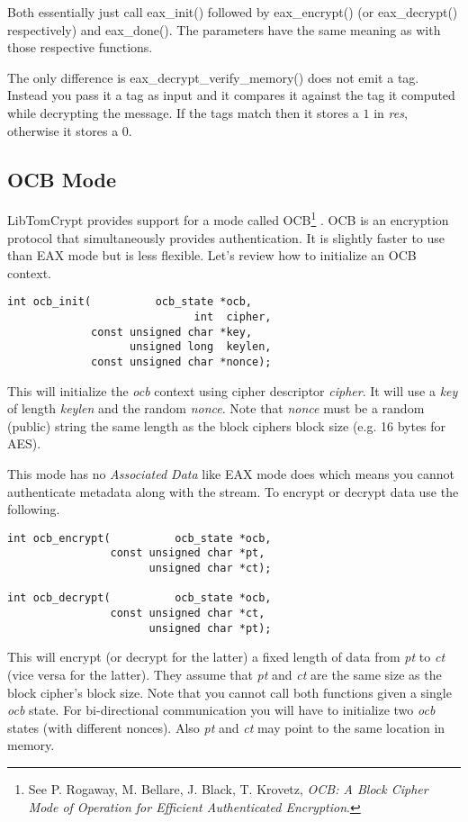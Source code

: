 \documentclass[synpaper]{book}
\begin{document}
Both essentially just call eax\_init() followed by eax\_encrypt() (or eax\_decrypt() respectively) and eax\_done().  The parameters
have the same meaning as with those respective functions.

The only difference is eax\_decrypt\_verify\_memory() does not emit a tag.  Instead you pass it a tag as input and it compares it against
the tag it computed while decrypting the message.  If the tags match then it stores a $1$ in \textit{res}, otherwise it stores a $0$.

\subsection{OCB Mode}
LibTomCrypt provides support for a mode called OCB\footnote{See
P. Rogaway, M. Bellare, J. Black, T. Krovetz, \textit{OCB: A Block Cipher Mode of Operation for Efficient Authenticated Encryption}.}
.  OCB is an encryption protocol that simultaneously provides authentication.  It is slightly faster to use than EAX mode
but is less flexible.  Let's review how to initialize an OCB context.

\begin{verbatim}
int ocb_init(          ocb_state *ocb,
                             int  cipher,
             const unsigned char *key,
                   unsigned long  keylen,
             const unsigned char *nonce);
\end{verbatim}

This will initialize the \textit{ocb} context using cipher descriptor \textit{cipher}.  It will use a \textit{key} of length \textit{keylen}
and the random \textit{nonce}.  Note that \textit{nonce} must be a random (public) string the same length as the block ciphers
block size (e.g. 16 bytes for AES).

This mode has no \textit{Associated Data} like EAX mode does which means you cannot authenticate metadata along with the stream.
To encrypt or decrypt data use the following.

 
\begin{verbatim}
int ocb_encrypt(          ocb_state *ocb,
                const unsigned char *pt,
                      unsigned char *ct);

int ocb_decrypt(          ocb_state *ocb,
                const unsigned char *ct,
                      unsigned char *pt);
\end{verbatim}

This will encrypt (or decrypt for the latter) a fixed length of data from \textit{pt} to \textit{ct} (vice versa for the latter).
They assume that \textit{pt} and \textit{ct} are the same size as the block cipher's block size.  Note that you cannot call
both functions given a single \textit{ocb} state.  For bi-directional communication you will have to initialize two \textit{ocb}
states (with different nonces).  Also \textit{pt} and \textit{ct} may point to the same location in memory.
\end{document}

